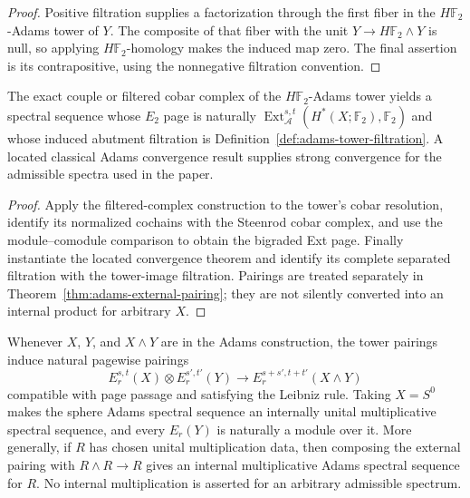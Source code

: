 \begin{proof}
  Positive filtration supplies a factorization through the first fiber in the
  $H\mathbb F_2$-Adams tower of $Y$.  The composite of that fiber with the
  unit $Y\to H\mathbb F_2\wedge Y$ is null, so applying
  $H\mathbb F_2$-homology makes the induced map zero.  The final assertion is
  its contrapositive, using the nonnegative filtration convention.
\end{proof}

\begin{theorem}
  \label{thm:adams-tower-ext-comparison}
  \notready
  The exact couple or filtered cobar complex of the
  $H\mathbb F_2$-Adams tower yields a spectral sequence whose $E_2$ page is
  naturally
  $\operatorname{Ext}_{\mathcal A}^{s,t}
  (H^*(X;\mathbb F_2),\mathbb F_2)$ and whose induced abutment filtration is
  Definition~\ref{def:adams-tower-filtration}.  A located classical Adams
  convergence result supplies strong convergence for the admissible spectra
  used in the paper.
\end{theorem}

\begin{proof}
  Apply the filtered-complex construction to the tower's cobar resolution,
  identify its normalized cochains with the Steenrod cobar complex, and use
  the module--comodule comparison to obtain the bigraded Ext page.  Finally
  instantiate the located convergence theorem and identify its complete
  separated filtration with the tower-image filtration.  Pairings are treated
  separately in Theorem~\ref{thm:adams-external-pairing}; they are not silently
  converted into an internal product for arbitrary $X$.
\end{proof}

\begin{theorem}
  \label{thm:adams-external-pairing}
  \notready
  Whenever $X$, $Y$, and $X\wedge Y$ are in the Adams construction, the tower
  pairings induce natural pagewise pairings
  \[
    E_r^{s,t}(X)\otimes E_r^{s',t'}(Y)
      \longrightarrow E_r^{s+s',t+t'}(X\wedge Y)
  \]
  compatible with page passage and satisfying the Leibniz rule.  Taking
  $X=S^0$ makes the sphere Adams spectral sequence an internally unital
  multiplicative spectral sequence, and every $E_r(Y)$ is naturally a module
  over it.  More generally, if $R$ has chosen unital multiplication data, then
  composing the external pairing with $R\wedge R\to R$ gives an internal
  multiplicative Adams spectral sequence for $R$.  No internal multiplication
  is asserted for an arbitrary admissible spectrum.
\end{theorem}

